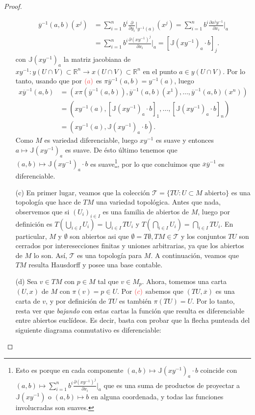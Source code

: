 \documentclass[11pt]{article}
\newcommand{\R}{\mathbb{R}}
\newcommand{\paint}[2]{\color{#1}{#2}}
\newcommand{\ol}{\overline}
\begin{document}
\begin{proof}
\begin{itemize}
\begin{align*}
\ol{y}^{-1}(a,b)(x^j) &= \sum_{i=1}^n b^i \frac{\partial}{\partial y_i}\Big|_{y^{-1}(a)}(x^j) = \sum_{i=1}^nb^i \frac{\partial x^jy^{-1}}{\partial x_i}\Big|_a \\ & = \sum_{i=1}^nb^i \frac{\partial (xy^{-1})^j}{\partial x_i}\Big|_a = [\mathbb{J}(xy^{-1})_a \cdot b]_j.
\end{align*}
con $\mathbb{J}(xy^{-1})_a$ la matriz jacobiana de $xy^{-1}:y(U \cap V) \subset \R^n \to x(U \cap V) \subset \R^n$ en el punto $a \in y(U \cap V)$. Por lo tanto, usando que por $\paint{red}{(a)}$ es $\pi \ol{y}^{-1}(a,b) = y^{-1}(a)$, luego
\begin{align*}
x\ol{y}^{-1}(a,b) & = (x\pi(\ol{y}^{-1}(a,b)),\ol{y}^{-1}(a,b)(x^1), \dots, \ol{y}^{-1}(a,b)(x^n)) \\ 
& = (xy^{-1}(a),[\mathbb{J}(xy^{-1})_a \cdot b]_1, \dots, [\mathbb{J}(xy^{-1})_a \cdot b]_n)\\
& = (xy^{-1}(a),\mathbb{J}(xy^{-1})_a \cdot b).
\end{align*}
Como $M$ es variedad diferenciable, luego $xy^{-1}$ es suave y entonces $a \mapsto \mathbb{J}(xy^{-1})_a$ es suave. De \'esto \'ultimo tenemos que $(a,b) \mapsto \mathbb{J}(xy^{-1})_a \cdot b$ es suave\footnote{Esto es porque en cada componente $(a,b) \mapsto \mathbb{J}(xy^{-1})_a \cdot b$ coincide con $(a,b) \mapsto \sum_{i=1}^nb^i \frac{\partial (xy^{-1})^j}{\partial x_i}\Big|_a$ que es una suma de productos de proyectar a $\mathbb{J}(xy^{-1})$ o $(a,b) \mapsto b$ en alguna coordenada, y todas las funciones involucradas son suaves.}, por lo que concluimos que $\ol{x}\ol{y}^{-1}$ es diferenciable.
\item[(c)] En primer lugar, veamos que la colecci\'on $\mathcal{T} = \{TU : U \subset M \text{ abierto}\}$ es una topolog\'ia que hace de $TM$ una variedad topol\'ogica. Antes que nada, observemos que si $(U_i)_{i \in I}$ es una familia de abiertos de $M$, luego por definici\'on es $T(\bigcup_{i \in I}U_i) = \bigcup_{i \in I}TU_i$ y $T(\bigcap_{i \in I}U_i) = \bigcap_{i \in I}TU_i$. En particular, $M$ y $\emptyset$ son abiertos asi que $\emptyset = T\emptyset,TM \in \mathcal{T}$ y los conjuntos $TU$ son cerrados por interesecciones finitas y uniones arbitrarias, ya que los abiertos de $M$ lo son. As\'i, $\mathcal{T}$ es una topolog\'ia para $M$. A continuaci\'on, veamos que $TM$ resulta Hausdorff y posee una base contable. 
\item[(d)] Sea $v \in TM$ con $p \in M$ tal que $v \in M_p$. Ahora, tomemos una carta $(U,x)$ de $M$ con $\pi(v) = p \in U$. Por $\paint{red}{(c)}$ sabemos que $(TU, \ol{x})$ es una carta de $v$, y por definici\'on de $TU$ es tambi\'en $\pi(TU) = U$. Por lo tanto, resta ver que \textit{bajando} con estas cartas la funci\'on que resulta es diferenciable entre abiertos eucl\'ideos. Es decir, basta con probar que la flecha punteada del siguiente diagrama conmutativo es diferenciable:

\end{itemize}
\end{proof}
\end{document}
